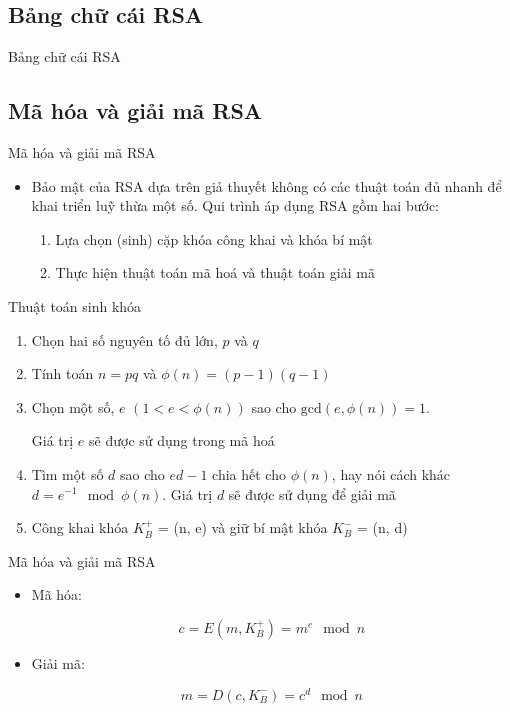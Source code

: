 \documentclass{beamer}
\numberwithin{equation}{section}
\begin{document}
\subsection{Bảng chữ cái RSA}
\begin{frame}{Bảng chữ cái RSA}

\end{frame}
\subsection{Mã hóa và giải mã RSA}
\begin{frame}{Mã hóa và giải mã RSA}
\begin{itemize}
\item Bảo mật của RSA dựa trên giả thuyết không có các thuật toán đủ nhanh để khai triển luỹ thừa một số. Qui trình áp dụng RSA gồm hai bước:
\begin{enumerate}
\item Lựa chọn (sinh) cặp khóa công khai và khóa bí mật
\item Thực hiện thuật toán mã hoá và thuật toán giải mã
\end{enumerate}
\end{itemize}
\end{frame}
\begin{frame}{Thuật toán sinh khóa}

\begin{enumerate}
\item Chọn hai số nguyên tố đủ lớn, $p$ và $q$
\item Tính toán $n = pq$ và $\phi(n) = (p - 1)(q - 1)$
\item Chọn một số, $e$ $(1 < e < \phi(n))$ sao cho $\text{gcd}(e, \phi(n)) = 1$.

Giá trị $e$ sẽ được sử dụng trong mã hoá
\item Tìm một số $d$ sao cho $ed - 1$ chia hết cho $\phi(n)$, hay nói cách khác $d = e^{-1} \mod \phi(n)$. Giá trị $d$ sẽ được sử dụng để giải mã
\item Công khai khóa $K^+_B$ = (n, e) và giữ bí mật khóa $K^-_B$ = (n, d)
\end{enumerate}
\end{frame}
\begin{frame}{Mã hóa và giải mã RSA}
\begin{itemize}
\item Mã hóa:

\[
c = E (m, K_B^+) = m^e \mod n
\]
\item Giải mã:

\[
m = D (c, K_B^-) = c^d \mod n
\]
\end{itemize}
\end{frame}
\end{document}
